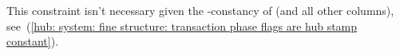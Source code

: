 This constraint isn't necessary given the \hubStamp-constancy of \txExec{} (and all other  columns),
see~(\ref{hub: system: fine structure: transaction phase flags are hub stamp constant}).
